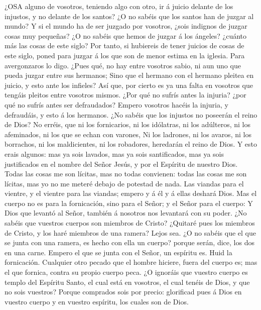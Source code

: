  ¿OSA alguno de vosotros, teniendo algo con otro, ir á
juicio delante de los injustos, y no delante de los santos? 
¿O no sabéis que los santos han de juzgar al mundo? Y si el mundo ha de
ser juzgado por vosotros, ¿sois indignos de juzgar cosas muy pequeñas?
 ¿O no sabéis que hemos de juzgar á los ángeles? ¿cuánto más
las cosas de este siglo?  Por tanto, si hubiereis de tener
juicios de cosas de este siglo, poned para juzgar á los que son de menor
estima en la iglesia.  Para avergonzaros lo digo. ¿Pues qué,
no hay entre vosotros sabio, ni aun uno que pueda juzgar entre sus
hermanos;  Sino que el hermano con el hermano pleitea en
juicio, y esto ante los infieles?  Así que, por cierto es ya
una falta en vosotros que tengáis pleitos entre vosotros mismos. ¿Por
qué no sufrís antes la injuria? ¿por qué no sufrís antes ser
defraudados?  Empero vosotros hacéis la injuria, y
defraudáis, y esto á los hermanos.  ¿No sabéis que los
injustos no poseerán el reino de Dios? No erréis, que ni los
fornicarios, ni los idólatras, ni los adúlteros, ni los afeminados, ni
los que se echan con varones,  Ni los ladrones, ni los
avaros, ni los borrachos, ni los maldicientes, ni los robadores,
heredarán el reino de Dios.  Y esto erais algunos: mas ya
sois lavados, mas ya sois santificados, mas ya sois justificados en el
nombre del Señor Jesús, y por el Espíritu de nuestro Dios. 
Todas las cosas me son lícitas, mas no todas convienen: todas las cosas
me son lícitas, mas yo no me meteré debajo de potestad de nada.
 Las viandas para el vientre, y el vientre para las
viandas; empero y á él y á ellas deshará Dios. Mas el cuerpo no es para
la fornicación, sino para el Señor; y el Señor para el cuerpo:
 Y Dios que levantó al Señor, también á nosotros nos
levantará con su poder.  ¿No sabéis que vuestros cuerpos
son miembros de Cristo? ¿Quitaré pues los miembros de Cristo, y los haré
miembros de una ramera? Lejos sea.  ¿O no sabéis que el que
se junta con una ramera, es hecho con ella un cuerpo? porque serán,
dice, los dos en una carne.  Empero el que se junta con el
Señor, un espíritu es.  Huid la fornicación. Cualquier otro
pecado que el hombre hiciere, fuera del cuerpo es; mas el que fornica,
contra su propio cuerpo peca.  ¿O ignoráis que vuestro
cuerpo es templo del Espíritu Santo, el cual está en vosotros, el cual
tenéis de Dios, y que no sois vuestros?  Porque comprados
sois por precio: glorificad pues á Dios en vuestro cuerpo y en vuestro
espíritu, los cuales son de Dios.

